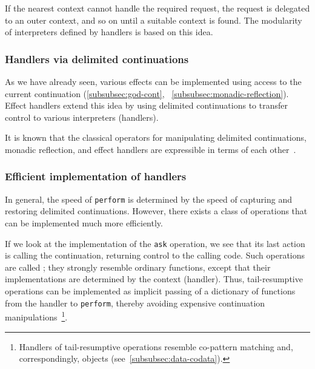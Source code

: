If the nearest context cannot handle the required request, the request is delegated to an outer context, and so on until a suitable context is found.
The modularity of interpreters defined by handlers is based on this idea.




\subsubsection{Handlers via delimited continuations}

As we have already seen, various effects can be implemented using access to the current continuation (\ref{subsubsec:god-cont}, \ \ref{subsubsec:monadic-reflection}).
Effect handlers extend this idea by using delimited continuations to transfer control to various interpreters (handlers).

It is known that the classical operators for manipulating delimited continuations, monadic reflection, and effect handlers are expressible in terms of each other~\cite{forster2017expressive}.

\subsubsection{Efficient implementation of handlers} \label{subsubsec:evidence-passing}

In general, the speed of \texttt{perform} is determined by the speed of capturing and restoring delimited continuations.
However, there exists a class of operations that can be implemented much more efficiently.

If we look at the implementation of the \texttt{ask} operation, we see that its last action is calling the continuation, returning control to the calling code.
Such operations are called ; they strongly resemble ordinary functions, except that their implementations are determined by the context (handler).
Thus, tail-resumptive operations can be implemented as implicit passing of a dictionary of functions from the handler to \texttt{perform}, thereby avoiding expensive continuation manipulations~\cite{xie2020effect}\footnote{Handlers of tail-resumptive operations resemble co-pattern matching and, correspondingly, objects (see\ \ref{subsubsec:data-codata}).}.

